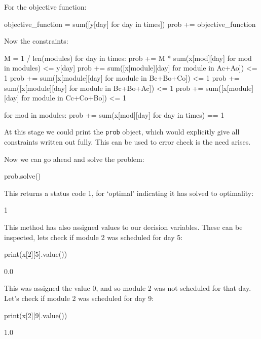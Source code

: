 For the objective function:

\begin{pyin}
objective_function = sum([y[day] for day in times])
prob += objective_function
\end{pyin}

Now the constraints:

\begin{pyin}
M = 1 / len(modules)
for day in times:
    prob += M * sum(x[mod][day] for mod in modules) <= y[day]
    prob += sum([x[module][day] for module in Ac+Ao]) <= 1
    prob += sum([x[module][day] for module in Bc+Bo+Co]) <= 1
    prob += sum([x[module][day] for module in Bc+Bo+Ac]) <= 1
    prob += sum([x[module][day] for module in Cc+Co+Bo]) <= 1

for mod in modules:
    prob += sum(x[mod][day] for day in times) == 1
\end{pyin}

At this stage we could print the \texttt{prob} object, which would
explicitly give all constraints written out fully. This can be used to error
check is the need arises.

Now we can go ahead and solve the problem:

\begin{pyin}
prob.solve()
\end{pyin}

This returns a status code 1, for `optimal' indicating it has solved to
optimality:

\begin{pyout}
1
\end{pyout}

This method has also assigned values to our decision variables. These can be
inspected, lets check if module 2 was scheduled for day 5:

\begin{pyin}
print(x[2][5].value())
\end{pyin}

\begin{pyout}
0.0
\end{pyout}

This was assigned the value 0, and so module 2 was not scheduled for that day.
Let's check if module 2 was scheduled for day 9:

\begin{pyin}
print(x[2][9].value())
\end{pyin}

\begin{pyout}
1.0
\end{pyout}

